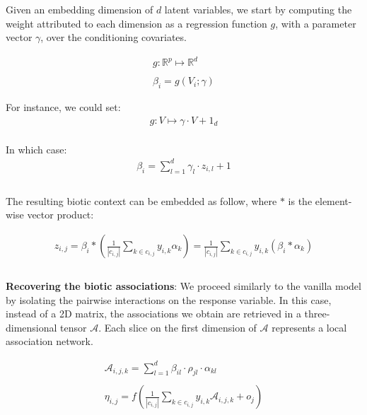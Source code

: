 \documentclass[]{article}
\begin{document}
Given an embedding dimension of $d$ latent variables, we start by computing the weight attributed to each dimension as a regression function $g$, with a parameter vector $\gamma$, over the conditioning covariates.      

\begin{equation*}
\begin{matrix}
g: \mathbb{R}^p \mapsto \mathbb{R}^d \\\\
\beta_i=g(V_i ; \gamma)
\end{matrix}
\end{equation*}

For instance, we could set:
\begin{equation*}
\begin{matrix}
g: V \mapsto \gamma \cdot V + 1_d \\
\end{matrix}
\end{equation*}

In which case:  
\begin{equation*}
\begin{matrix}
\beta_i= \sum_{l=1}^{d} \gamma_l \cdot z_{i,l} + 1  \\\\  
\end{matrix}
\end{equation*}

The resulting biotic context can be embedded as follow, where $*$ is the element-wise vector product: 

\begin{equation*}
\begin{matrix}
z_{i,j} = \beta_i * (\frac{1}{|c_{i,j}|}\sum_{k \in c_{i,j}} y_{i,k} \alpha_{k}) = \frac{1}{|c_{i,j}|}\sum_{k \in c_{i,j}} y_{i,k} (\beta_i * \alpha_{k}) \\\\
\end{matrix}
\end{equation*}

\textbf{Recovering the biotic associations}: We proceed similarly to the vanilla model by isolating the pairwise interactions on the response variable. In this case, instead of a 2D matrix, the associations we obtain are retrieved in a three-dimensional tensor $\mathcal{A}$. Each slice on the first dimension of $\mathcal{A}$ represents a local association network.

\begin{equation*}
\begin{matrix}
\mathcal{A}_{i,j,k} = \sum_{l=1}^{d} \beta_{il} \cdot \rho_{jl} \cdot \alpha_{kl} \\\\
\eta_{i,j} = f(\frac{1}{|c_{i,j}|} \sum_{k \in c_{i,j}} y_{i,k} \mathcal{A}_{i,j,k} + o_j)\\\\
\end{matrix}
\end{equation*}
\end{document}
